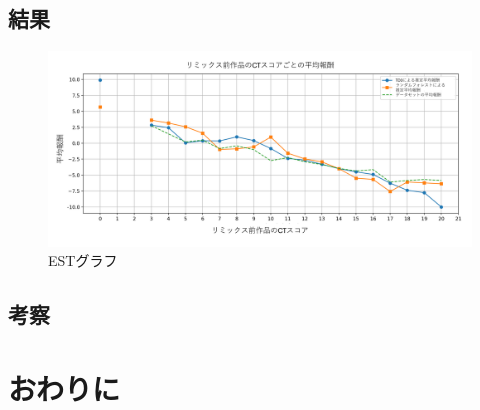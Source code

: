 \documentclass[submit,techrep,noauthor]{ipsj}
\begin{document}
\subsection{結果}

\begin{figure}[t]
  \centering
  \includegraphics[width=\textwidth]{@IPSJ_SIGSE202511_Horio/estgraph.pdf}
  \caption{ESTグラフ}
  \label{estgraph}
\end{figure}

\subsection{考察}

\section{おわりに}



\end{document}
